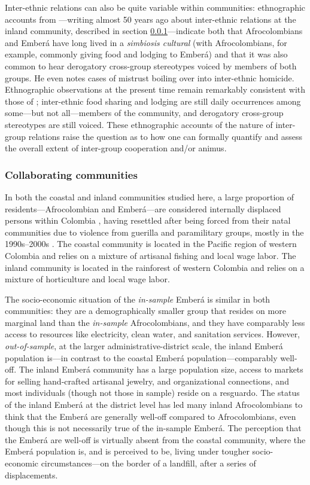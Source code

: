 \documentclass[bibauthoryear]{aa}
\begin{document}
Inter-ethnic relations can also be quite variable within communities: ethnographic accounts from \citet{Cay73}---writing almost 50 years ago about inter-ethnic relations at the inland community, described in section \ref{pops}---indicate both that Afrocolombians and Ember\'a have long lived in a \textit{simbiosis cultural} (with Afrocolombians, for example, commonly giving food and lodging to Ember\'a) and that it was also common to hear derogatory cross-group stereotypes voiced by members of both groups. He even notes cases of mistrust boiling over into inter-ethnic homicide. Ethnographic observations at the present time remain remarkably consistent with those of \citet{Cay73}; inter-ethnic food sharing and lodging are still daily occurrences among some---but not all---members of the community, and derogatory cross-group stereotypes are still voiced. These ethnographic accounts of the nature of inter-group relations raise the question as to how one can formally quantify and assess the overall extent of inter-group cooperation and/or animus. 

\subsubsection{Collaborating communities}\label{pops}
In both the coastal and inland communities studied here, a large proportion of residents---Afrocolombian and Ember\'a---are considered internally displaced persons within Colombia \citep{oyola2015religion, escobar2003displacement}, having resettled after being forced from their natal communities due to violence from guerilla and paramilitary groups, mostly in the 1990s--2000s \citep{ibanez2009forced}. The coastal community is located in the Pacific region of western Colombia and relies on a mixture of artisanal fishing and local wage labor.  The inland community is located in the rainforest of western Colombia and relies on a mixture of horticulture and local wage labor.

The socio-economic situation of the \emph{in-sample} Ember\'a is similar in both communities: they are a demographically smaller group that resides on more marginal land than the \emph{in-sample} Afrocolombians, and they have comparably less access to resources like electricity, clean water, and sanitation services.  However,  \emph{out-of-sample}, at the larger administrative-district scale, the inland Ember\'a population is---in contrast to the coastal Ember\'a population---comparably well-off.  The inland Ember\'a community has a large population size, access to markets for selling hand-crafted artisanal jewelry,  and organizational connections, and most individuals (though not those in sample) reside on a resguardo.  The status of the inland Ember\'a at the district level has led many inland Afrocolombians to think that the Ember\'a are generally well-off compared to Afrocolombians, even though this is not necessarily true of the in-sample Ember\'a. The perception that the Ember\'a are well-off is virtually absent from the coastal community, where the Ember\'a population is, and is  perceived to be, living under tougher  socio-economic circumstances---on the border of a landfill, after a series of displacements.
\end{document}

